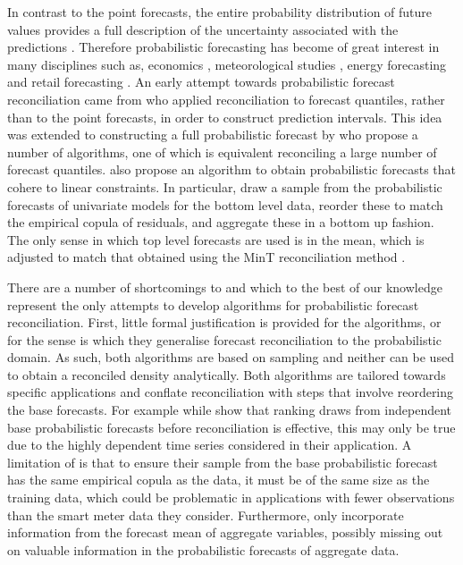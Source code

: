 \documentclass[12pt]{article}
\theoremstyle{definition}
\begin{document}
In contrast to the point forecasts, the entire probability distribution of future values provides a full description of the uncertainty associated with the predictions \citep{Abramson1995, Gneiting2014}. Therefore probabilistic forecasting has become of great interest in many disciplines such as, economics \citep{zarnowitz1987, rossi2014}, meteorological studies \citep{pinson2009, mclean2013}, energy forecasting \citep{wytock2013, BenTaieb2017} and retail forecasting \citep{bose2017}. An early attempt towards probabilistic forecast reconciliation came from \cite{ShaHyn2017} who applied reconciliation to forecast quantiles, rather than to the point forecasts, in order to construct prediction intervals.  This idea was extended to constructing a full probabilistic forecast by \citet{JeoEtAl2019} who propose a number of algorithms, one of which is equivalent reconciling a large number of forecast quantiles.  \citet{Taieb2017} also propose an algorithm to obtain probabilistic forecasts that cohere to linear constraints. In particular, \citet{Taieb2017} draw a sample from the probabilistic forecasts of univariate models for the bottom level data, reorder these to match the empirical copula of residuals, and aggregate these in a bottom up fashion.  The only sense in which top level forecasts are used is in the mean, which is adjusted to match that obtained using the MinT reconciliation method \citep{WicEtAl2019}.

There are a number of shortcomings to \citet{JeoEtAl2019} and \citet{Taieb2017} which to the best of our knowledge represent the only attempts to develop algorithms for probabilistic forecast reconciliation.  First, little formal justification is provided for the algorithms, or for the sense is which they generalise forecast reconciliation to the probabilistic domain.  As such, both algorithms are based on sampling and neither can be used to obtain a reconciled density analytically.  Both algorithms are tailored towards specific applications and conflate reconciliation with steps that involve reordering the base forecasts.  For example while  \citet{JeoEtAl2019} show that ranking draws from independent base probabilistic forecasts before reconciliation is effective, this may only be true due to the highly dependent time series considered in their application. A limitation of \citet{Taieb2017} is that to ensure their sample from the base probabilistic forecast has the same empirical copula as the data, it must be of the same size as the training data, which could be problematic in applications with fewer observations than the smart meter data they consider.  Furthermore, \citet{Taieb2017} only incorporate information from the forecast mean of aggregate variables, possibly missing out on valuable information in the probabilistic forecasts of aggregate data.
\end{document}
